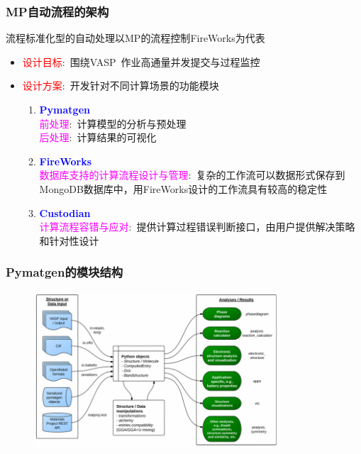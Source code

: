 {{\frame
{
	\frametitle{\textrm{MP}自动流程的架构}
流程标准化型的自动处理以\textrm{MP}的流程控制\textrm{FireWorks}为代表
	\begin{itemize}
		\item \textcolor{red}{设计目标}:~围绕\textrm{VASP~}作业高通量并发提交与过程监控
		\item \textcolor{red}{设计方案}:~开发针对不同计算场景的功能模块
			\begin{enumerate}
    \setlength{\itemsep}{7pt}
				\item \textcolor{blue}{\textbf{Pymatgen}}\\
					\textcolor{magenta}{前处理}:~计算模型的分析与预处理\\
					\textcolor{magenta}{后处理}:~计算结果的可视化
				\item \textcolor{blue}{\textbf{FireWorks}}\\
					\textcolor{magenta}{数据库支持的计算流程设计与管理}:~复杂的工作流可以数据形式保存到\textrm{MongoDB}数据库中，用\textrm{FireWorks}设计的工作流具有较高的稳定性
				\item \textcolor{blue}{\textbf{Custodian}}\\
\textcolor{magenta}{计算流程容错与应对}:~提供计算过程错误判断接口，由用户提供解决策略和针对性设计
			\end{enumerate}
	\end{itemize}
}

\frame
{
	\frametitle{\textrm{Pymatgen}的模块结构}
\begin{figure}[h!]
\centering
\vspace*{-0.1in}
\includegraphics[height=2.3in]{Figures/MP_library.png}
\caption{\fontsize{7.2pt}{4.2pt}}%
\label{Pymatgen_Lib}
\end{figure} 
}

}}
